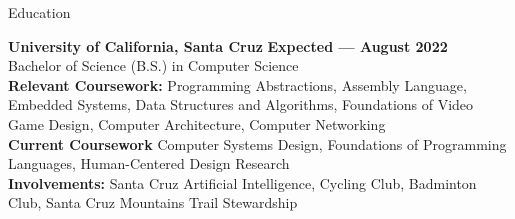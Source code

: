 \documentclass{resume}
\begin{document}
\begin{rSection}{\large Education}

{\bf University of California, Santa Cruz} \hfill {\bf{Expected --- August 2022}}
\\ Bachelor of Science (B.S.) in Computer Science\hfill %
\\ \textbf{Relevant Coursework:} Programming Abstractions, Assembly Language, Embedded Systems, Data Structures and Algorithms, Foundations of Video Game Design, Computer Architecture, Computer Networking
\\ \textbf{Current Coursework} Computer Systems Design, Foundations of Programming Languages, Human-Centered Design Research
\\ \textbf{Involvements:}  Santa Cruz Artificial Intelligence, Cycling Club, Badminton Club, Santa Cruz Mountains Trail Stewardship 

\end{rSection}
\end{document}
